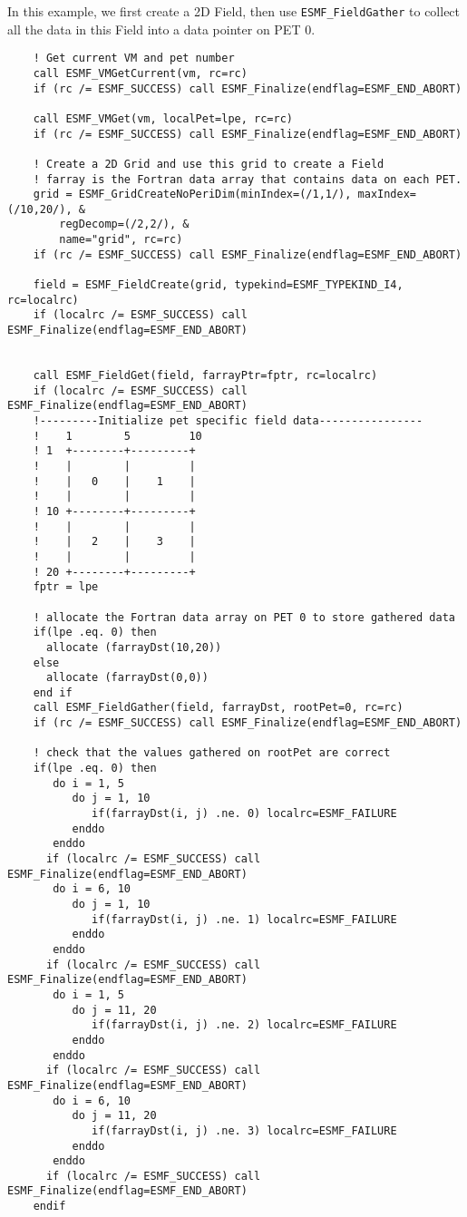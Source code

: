    In this example, we first create a 2D Field, then use {\tt ESMF\_FieldGather} to
   collect all the data in this Field into a data pointer on PET 0. 

 \begin{verbatim}
    ! Get current VM and pet number
    call ESMF_VMGetCurrent(vm, rc=rc)
    if (rc /= ESMF_SUCCESS) call ESMF_Finalize(endflag=ESMF_END_ABORT)

    call ESMF_VMGet(vm, localPet=lpe, rc=rc)
    if (rc /= ESMF_SUCCESS) call ESMF_Finalize(endflag=ESMF_END_ABORT)

    ! Create a 2D Grid and use this grid to create a Field
    ! farray is the Fortran data array that contains data on each PET.
    grid = ESMF_GridCreateNoPeriDim(minIndex=(/1,1/), maxIndex=(/10,20/), &
        regDecomp=(/2,2/), &
        name="grid", rc=rc)
    if (rc /= ESMF_SUCCESS) call ESMF_Finalize(endflag=ESMF_END_ABORT)

    field = ESMF_FieldCreate(grid, typekind=ESMF_TYPEKIND_I4, rc=localrc)
    if (localrc /= ESMF_SUCCESS) call ESMF_Finalize(endflag=ESMF_END_ABORT)


    call ESMF_FieldGet(field, farrayPtr=fptr, rc=localrc)
    if (localrc /= ESMF_SUCCESS) call ESMF_Finalize(endflag=ESMF_END_ABORT)
    !---------Initialize pet specific field data----------------
    !    1        5         10
    ! 1  +--------+---------+
    !    |        |         |
    !    |   0    |    1    |
    !    |        |         |
    ! 10 +--------+---------+
    !    |        |         |
    !    |   2    |    3    |
    !    |        |         |
    ! 20 +--------+---------+
    fptr = lpe

    ! allocate the Fortran data array on PET 0 to store gathered data
    if(lpe .eq. 0) then
      allocate (farrayDst(10,20))
    else
      allocate (farrayDst(0,0))
    end if
    call ESMF_FieldGather(field, farrayDst, rootPet=0, rc=rc)
    if (rc /= ESMF_SUCCESS) call ESMF_Finalize(endflag=ESMF_END_ABORT)

    ! check that the values gathered on rootPet are correct
    if(lpe .eq. 0) then
       do i = 1, 5
          do j = 1, 10
             if(farrayDst(i, j) .ne. 0) localrc=ESMF_FAILURE
          enddo
       enddo
      if (localrc /= ESMF_SUCCESS) call ESMF_Finalize(endflag=ESMF_END_ABORT)
       do i = 6, 10
          do j = 1, 10
             if(farrayDst(i, j) .ne. 1) localrc=ESMF_FAILURE
          enddo
       enddo
      if (localrc /= ESMF_SUCCESS) call ESMF_Finalize(endflag=ESMF_END_ABORT)
       do i = 1, 5
          do j = 11, 20
             if(farrayDst(i, j) .ne. 2) localrc=ESMF_FAILURE
          enddo
       enddo
      if (localrc /= ESMF_SUCCESS) call ESMF_Finalize(endflag=ESMF_END_ABORT)
       do i = 6, 10
          do j = 11, 20
             if(farrayDst(i, j) .ne. 3) localrc=ESMF_FAILURE
          enddo
       enddo
      if (localrc /= ESMF_SUCCESS) call ESMF_Finalize(endflag=ESMF_END_ABORT)
    endif


\end{verbatim}
